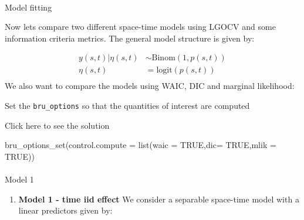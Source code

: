 \documentclass[
  letterpaper,
  DIV=11,
  numbers=noendperiod]{scrartcl}
\makeatletter
\let\oldparagraph\paragraph
\renewcommand{\paragraph}{
    \@ifstar
      \xxxParagraphStar
      \xxxParagraphNoStar
  }
\newcommand{\xxxParagraphStar}[1]{\oldparagraph*{#1}\mbox{}}
\newcommand{\xxxParagraphNoStar}[1]{\oldparagraph{#1}\mbox{}}
\newenvironment{Shaded}{\begin{snugshade}}{\end{snugshade}}
\newcommand{\AttributeTok}[1]{\textcolor[rgb]{0.40,0.45,0.13}{#1}}
\newcommand{\ConstantTok}[1]{\textcolor[rgb]{0.56,0.35,0.01}{#1}}
\newcommand{\FunctionTok}[1]{\textcolor[rgb]{0.28,0.35,0.67}{#1}}
\newcommand{\NormalTok}[1]{\textcolor[rgb]{0.00,0.23,0.31}{#1}}
\providecommand{\tightlist}{%
  \setlength{\itemsep}{0pt}\setlength{\parskip}{0pt}}
\makeatother
\begin{document}
\paragraph{Model fitting}\label{model-fitting}

Now lets compare two different space-time models using LGOCV and some
information criteria metrics. The general model structure is given by:

\[
\begin{aligned}
y(s,t)|\eta(s,t)&\sim\text{Binom}(1, p(s,t))\\
\eta(s,t) &= \text{logit}(p(s,t)) \\
\end{aligned}
\] We also want to compare the models using WAIC, DIC and marginal
likelihood:

\begin{tcolorbox}[enhanced jigsaw, arc=.35mm, left=2mm, colback=white, colbacktitle=quarto-callout-warning-color!10!white, coltitle=black, colframe=quarto-callout-warning-color-frame, titlerule=0mm, leftrule=.75mm, bottomtitle=1mm, title={Task}, toprule=.15mm, breakable, toptitle=1mm, rightrule=.15mm, bottomrule=.15mm, opacitybacktitle=0.6, opacityback=0]

Set the \texttt{bru\_options} so that the quantities of interest are
computed

Click here to see the solution

\begin{Shaded}
\begin{Highlighting}[]
\FunctionTok{bru\_options\_set}\NormalTok{(}\AttributeTok{control.compute =} \FunctionTok{list}\NormalTok{(}\AttributeTok{waic =} \ConstantTok{TRUE}\NormalTok{,}\AttributeTok{dic=} \ConstantTok{TRUE}\NormalTok{,}\AttributeTok{mlik =} \ConstantTok{TRUE}\NormalTok{))}
\end{Highlighting}
\end{Shaded}

\end{tcolorbox}

\paragraph{Model 1}\label{model-1}

\begin{enumerate}
\def\labelenumi{\arabic{enumi}.}
\tightlist
\item
  \textbf{Model 1 - time iid effect} We consider a separable space-time
  model with a linear predictors given by:
\end{enumerate}
\end{document}
